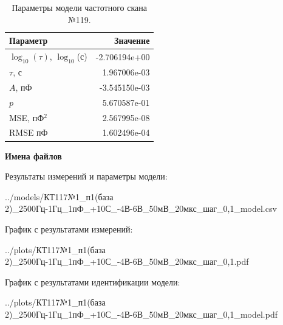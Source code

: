 \begin{table}[!ht]
    \centering
    \caption{Параметры модели частотного скана №119.}
    \begin{tabular}{|l|r|}
        \hline
        Параметр                                       & Значение                  \\ \hline
        $\log_{10}(\tau)$, $\log_{10}$(с)              & -2.706194e+00             \\ \hline
        $\tau$, с                                      & 1.967006e-03              \\ \hline
        $A$, пФ                                        & -3.545150e-03             \\ \hline
        $p$                                            & 5.670587e-01              \\ \hline
        MSE, пФ$^2$                                    & 2.567995e-08              \\ \hline
        RMSE пФ                                        & 1.602496e-04              \\ \hline
    \end{tabular}
    \label{table:frequency_scan_model_119}
\end{table}

\textbf{Имена файлов}

Результаты измерений и параметры модели:

\scriptsize../models/КТ117№1\_п1(база 2)\_2500Гц-1Гц\_1пФ\_+10С\_-4В-6В\_50мВ\_20мкс\_шаг\_0,1\_model.csv
\normalsize

График с результатами измерений:

\scriptsize../plots/КТ117№1\_п1(база 2)\_2500Гц-1Гц\_1пФ\_+10С\_-4В-6В\_50мВ\_20мкс\_шаг\_0,1.pdf
\normalsize

График с результатами идентификации модели:

\scriptsize../plots/КТ117№1\_п1(база 2)\_2500Гц-1Гц\_1пФ\_+10С\_-4В-6В\_50мВ\_20мкс\_шаг\_0,1\_model.pdf
\normalsize

